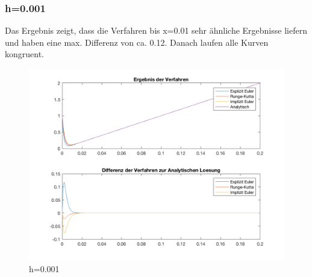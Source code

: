 \documentclass[]{scrartcl}
\begin{document}
\subsubsection{h=0.001}
Das Ergebnis zeigt, dass die Verfahren bis x=0.01 sehr ähnliche Ergebnisse liefern und haben eine max. Differenz von ca. 0.12. Danach laufen alle Kurven kongruent.
\begin{figure}[htbp]
\centering
\includegraphics[width=1\linewidth]{a1_1_1}
\caption{h=0.001}
\label{fig:a1_1_1}
\end{figure}
\end{document}
